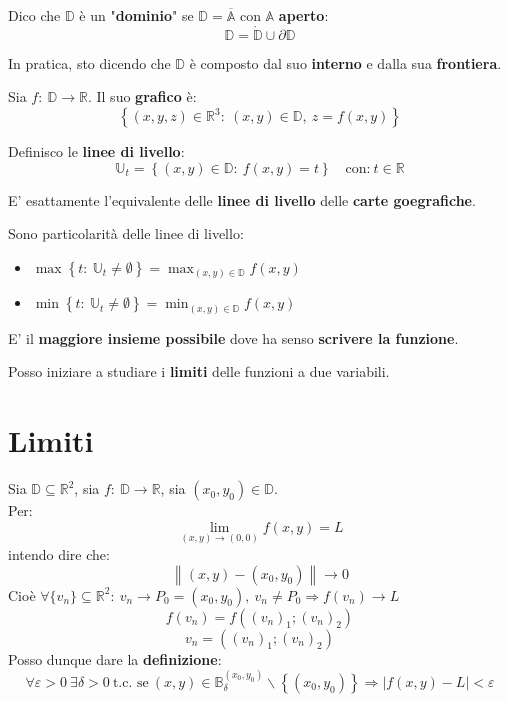 \documentclass[a4paper, oneside]{article}
\newcommand\U{\mathbb{U}}
\newcommand\R{\mathbb{R}}
\newcommand\B{\mathbb{B}}
\newcommand\A{\mathbb{A}}
\newcommand\D{\mathbb{D}}
\newcommand\de{\partial}
\begin{document}
    \begin{definition}
        Dico che $\D$ è un "\textbf{dominio}" se $\D=\overline{\A}$ con $\A$ \textbf{aperto}:
        \[ \D = \mathring{\D} \cup \de\D \]
    \end{definition}
    \noindent In pratica, sto dicendo che $\D$ è composto dal suo \textbf{interno} e dalla sua \textbf{frontiera}.

    \begin{definition}
        Sia $f: \ \D\to\R$. Il suo \textbf{grafico} è:
        \[\left\{(x,y,z)\in\R^3: \ (x,y)\in\D, \ z=f(x,y)\right\}\]
    \end{definition}

    \begin{definition}
        Definisco le \textbf{linee di livello}:
        \[\U_t = \left\{(x,y)\in\D: \ f(x,y) = t\right\} \quad\text{con:} \ t\in\R\]
    \end{definition}
    \noindent E' esattamente l'equivalente delle \textbf{linee di livello} delle \textbf{carte goegrafiche}.

    \begin{observation}
    Sono particolarità delle linee di livello:
        \begin{itemize}
            \item $\displaystyle \max\left\{t: \ \U_t\neq \emptyset\right\} = \max_{(x,y)\in\D} f(x,y)$
            \item $\displaystyle \min\left\{t: \ \U_t\neq \emptyset \right\} = \min_{(x,y)\in\D} f(x,y)$
        \end{itemize}
    \end{observation}

    \begin{definition}
        E' il \textbf{maggiore insieme possibile} dove ha senso \textbf{scrivere la funzione}.
    \end{definition}

    \noindent Posso iniziare a studiare i \textbf{limiti} delle funzioni a due variabili.

    \newpage

    \section{Limiti}

    Sia $\D \subseteq \R^2$, sia $f: \ \D\to\R$, sia $(x_0,y_0)\in\D$.\\
    Per:
    \[\lim_{(x,y)\to(0,0)} f(x,y) = L\]
    intendo dire che:
    \[\left\lVert (x,y) - (x_0,y_0)\right\rVert \to 0\]
    Cioè $\forall\{v_n\}\subseteq\R^2: \ v_n\to P_0 = (x_0,y_0), \ v_n\ne P_0 \Longrightarrow f(v_n)\to L$\\
    \[f(v_n) = f\left((v_n)_1;(v_n)_2\right)\]
    \[v_n = \left((v_n)_1;(v_n)_2\right)\]
    Posso dunque dare la \textbf{definizione}:
    \[\forall\varepsilon > 0 \ \exists\delta >0 \ \text{t.c. se} \ (x,y)\in\B_\delta^{(x_0,y_0)}\backslash \left\{(x_0,y_0)\right\} \Longrightarrow \left|f(x,y) - L\right| < \varepsilon\]
\end{document}
